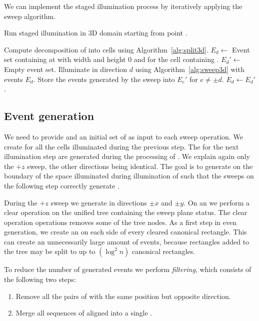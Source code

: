 \documentclass[english,gradu]{tktltiki2018}
\begin{document}
We can implement the staged illumination process by iteratively applying the sweep algorithm.

\begin{alg}\label{alg:minlink3d}
Run staged illumination in 3D domain \fspace starting from point \spt.
\begin{algorithmic}
\State Compute decomposition of \fspace into cells using Algorithm~\ref{alg:split3d}.
	\State $E_d\gets$ Event set containing \addE at \spt with width and height 0 and \cellE for the cell containing \spt.
\EndFor
{}
		\State $E_d'\gets$ Empty event set.
	\EndFor
		\State Illuminate in direction $d$ using Algorithm~\ref{alg:sweep3d} with events $E_d$.
		\State Store the events generated by the sweep into $E_e'$ for $e\neq\pm d$.
	\EndFor
		\State $E_d\gets E_d'$.
	\EndFor
\EndWhile
\end{algorithmic}
\end{alg}

\subsection{Event generation}\label{sec:evtgen}

We need to provide \addEs and an initial set of \cellEs as input to each sweep operation.
We create \cellEs for all the cells illuminated during the previous step.
The \addEs for the next illumination step are generated during the processing of \obsEs.
We explain again only the $+z$ sweep, the other directions being identical.
The goal is to generate \addEs on the boundary of the space illuminated during illumination of  such that the sweeps on the following step correctly generate .

During the $+z$ sweep we generate \addEs in directions $\pm x$ and $\pm y$.
On an \obsE we perform a clear operation on the unified tree containing the sweep plane status.
The clear operation operations removes some of the tree nodes.
As a first step in even generation, we create an \addE on each side of every cleared canonical rectangle.
This can create an unnecessarily large amount of events, because rectangles added to the tree may be split to up to $(\log^2 n)$ canonical rectangles.

To reduce the number of generated events we perform \emph{filtering}, which consists of the following two steps:
\begin{enumerate}
\item Remove all the pairs of \addEs with the same position but opposite direction.
\item Merge all sequences of aligned \addEs into a single \addE.
\end{enumerate}
\end{document}
